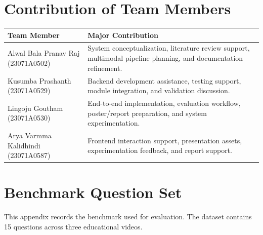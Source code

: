 \documentclass[12pt,a4paper,oneside]{report}
\begin{document}
\appendix

\chapter{Contribution of Team Members}
\begin{tabularx}{\textwidth}{p{} X}
\toprule
\textbf{Team Member} & \textbf{Major Contribution} \\
\midrule
Alwal Bala Pranav Raj (23071A0502) & System conceptualization, literature review support, multimodal pipeline planning, and documentation refinement. \\
Kusumba Prashanth (23071A0529) & Backend development assistance, testing support, module integration, and validation discussion. \\
Lingoju Goutham (23071A0530) & End-to-end implementation, evaluation workflow, poster/report preparation, and system experimentation. \\
Arya Varmma Kalidhindi (23071A0587) & Frontend interaction support, presentation assets, experimentation feedback, and report support. \\
\bottomrule
\end{tabularx}

\chapter{Benchmark Question Set}
This appendix records the benchmark used for evaluation. The dataset contains 15 questions across three educational videos.
\end{document}
